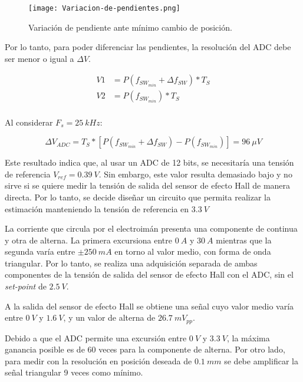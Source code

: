\begin{figure}[H]
	\centering
	\texttt{[image: Variacion-de-pendientes.png]}
	\caption{Variación de pendiente ante mínimo cambio de posición.}
	\label{fig:variacion-de-pendiente}
\end{figure}

\noindent Por lo tanto, para poder diferenciar las pendientes, la resolución del ADC debe ser menor o igual a $\Delta V$.

\begin{equation} 
	\begin{aligned}
		V1 &= P(f_{SW_{min}} + \Delta f_{SW})* T_S \\
		V2 &= P(f_{SW_{min}})* T_S \\		 
	\end{aligned}
\end{equation}

\noindent Al considerar $F_s = 25\:kHz$:

\begin{equation} 
	\Delta V_{ADC} = T_S * [P(f_{SW_{min}} + \Delta f_{SW}) - P(f_{SW_{min}})] = 96\:\mu V
\end{equation}



\noindent Este resultado indica que, al usar un ADC de 12 bits, se necesitaría una tensión de referencia $V_{ref} = 0.39\:V$. Sin embargo, este valor resulta demasiado bajo y no sirve si se quiere medir la tensión de salida del sensor de efecto Hall de manera directa. Por lo tanto, se decide diseñar un circuito que permita realizar la estimación manteniendo la tensión de referencia en $3.3\:V$

\noindent La corriente que circula por el electroimán presenta una componente de continua y otra de alterna. La primera excursiona entre $0\:A$ y $30\:A$ mientras que la segunda varía entre $\pm 250\:mA$ en torno al valor medio, con forma de onda triangular. Por lo tanto, se realiza una adquisición separada de ambas componentes de la tensión de salida del sensor de efecto Hall con el ADC, sin el \textsl{set-point} de $2.5\:V$.

\noindent A la  salida del sensor de efecto Hall se obtiene una señal cuyo valor medio varía entre $0\:V$ y $1.6\:V$, y un valor de alterna de $26.7\:mV_{pp}$.

\noindent Debido a que el ADC permite una excursión entre $0\:V$ y $3.3\:V$, la máxima ganancia posible es de 60 veces para la componente de alterna. Por otro lado, para medir con la resolución en posición deseada de $0.1\:mm$ se debe amplificar la señal triangular 9 veces como mínimo.

